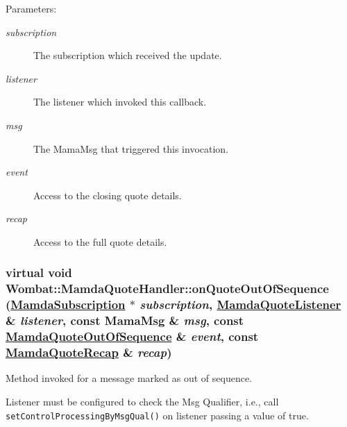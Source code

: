 \begin{Desc}
\item[Parameters:]
\begin{description}
\item[{\em subscription}]The subscription which received the update. \item[{\em listener}]The listener which invoked this callback. \item[{\em msg}]The Mama\-Msg that triggered this invocation. \item[{\em event}]Access to the closing quote details. \item[{\em recap}]Access to the full quote details. \end{description}
\end{Desc}
\hypertarget{classWombat_1_1MamdaQuoteHandler_313ca96dc5f5e98fffb000895b1671b3}{
\subsubsection[onQuoteOutOfSequence]{\setlength{\rightskip}{0pt plus 5cm}virtual void Wombat::Mamda\-Quote\-Handler::on\-Quote\-Out\-Of\-Sequence (\hyperlink{classWombat_1_1MamdaSubscription}{Mamda\-Subscription} $\ast$ {\em subscription}, \hyperlink{classWombat_1_1MamdaQuoteListener}{Mamda\-Quote\-Listener} \& {\em listener}, const Mama\-Msg \& {\em msg}, const \hyperlink{classWombat_1_1MamdaQuoteOutOfSequence}{Mamda\-Quote\-Out\-Of\-Sequence} \& {\em event}, const \hyperlink{classWombat_1_1MamdaQuoteRecap}{Mamda\-Quote\-Recap} \& {\em recap})}}
\label{classWombat_1_1MamdaQuoteHandler_313ca96dc5f5e98fffb000895b1671b3}


Method invoked for a message marked as out of sequence. 

Listener must be configured to check the Msg Qualifier, i.e., call {\tt set\-Control\-Processing\-By\-Msg\-Qual()} on listener passing a value of true.

